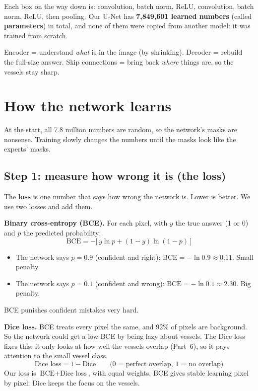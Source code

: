 \documentclass[11pt,a4paper]{article}
\begin{document}
Each box on the way down is: convolution, batch norm, ReLU, convolution, batch norm, ReLU, then pooling. Our U-Net has \textbf{7,849,601 learned numbers} (called \textbf{parameters}) in total, and none of them were copied from another model: it was trained from scratch.

\begin{remember}
Encoder = understand \emph{what} is in the image (by shrinking). Decoder = rebuild the full-size answer. Skip connections = bring back \emph{where} things are, so the vessels stay sharp.
\end{remember}

\section{How the network learns}

At the start, all 7.8 million numbers are random, so the network's masks are nonsense. Training slowly changes the numbers until the masks look like the experts' masks.

\subsection{Step 1: measure how wrong it is (the loss)}
The \textbf{loss} is one number that says how wrong the network is. Lower is better. We use two losses and add them.

\textbf{Binary cross-entropy (BCE).} For each pixel, with $y$ the true answer (1 or 0) and $p$ the predicted probability:
\[
\text{BCE} = -\big[\, y \ln p + (1-y)\ln(1-p) \,\big]
\]
\begin{example}[: BCE on one vessel pixel ($y = 1$)]
\begin{itemize}
  \item The network says $p = 0.9$ (confident and right): $\text{BCE} = -\ln 0.9 \approx 0.11$. Small penalty.
  \item The network says $p = 0.1$ (confident and wrong): $\text{BCE} = -\ln 0.1 \approx 2.30$. Big penalty.
\end{itemize}
BCE punishes confident mistakes very hard.
\end{example}

\textbf{Dice loss.} BCE treats every pixel the same, and 92\% of pixels are background. So the network could get a low BCE by being lazy about vessels. The Dice loss fixes this: it only looks at how well the vessels overlap (Part~6), so it pays attention to the small vessel class.
\[
\text{Dice loss} = 1 - \text{Dice} \qquad \text{(0 = perfect overlap, 1 = no overlap)}
\]
Our loss is $\text{BCE} + \text{Dice loss}$, with equal weights. BCE gives stable learning pixel by pixel; Dice keeps the focus on the vessels.
\end{document}
